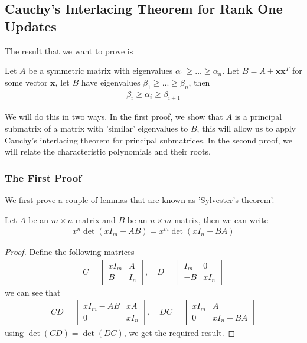 \documentclass{math}
\renewcommand{\vec}[1]{\boldsymbol{#1}}
\begin{document}
\subsection{Cauchy's Interlacing Theorem for Rank One Updates}

The result that we want to prove is

\begin{theorem}
    Let $A$ be a symmetric matrix with eigenvalues $\alpha_1 \geq ... \geq \alpha_n$.
    Let $B = A + \vec{x} \vec{x}^T$ for some vector $\vec{x}$, let $B$ have eigenvalues $\beta_1 \geq ... \geq \beta_n$, then
    \begin{align*}
        \beta_i \geq \alpha_i \geq \beta_{i + 1}
    \end{align*}
\end{theorem}

We will do this in two ways. In the first proof, we show that $A$ is a principal submatrix of a matrix with 'similar' eigenvalues to $B$,
this will allow us to apply Cauchy's interlacing theorem for principal submatrices.
In the second proof, we will relate the characteristic polynomials and their roots.

\subsubsection{The First Proof}

We first prove a couple of lemmas that are known as 'Sylvester's theorem'.

\begin{lemma}\label{lemma:sylvester}
    Let $A$ be an $m \times n$ matrix and $B$ be an $n \times m$ matrix, then we can write
    \begin{align*}
        x^n\det(xI_m - AB) = x^m\det(xI_n - BA)
    \end{align*}
\end{lemma}
\begin{proof}
    Define the following matrices
    \begin{align*}
        C = \begin{bmatrix}
            xI_m & A \\
            B & I_n
        \end{bmatrix},\quad
        D = \begin{bmatrix}
            I_m & 0 \\
            -B & xI_n
        \end{bmatrix}
    \end{align*}
    we can see that
    \begin{align*}
        CD = \begin{bmatrix}
            xI_m - AB & xA \\
            0 & xI_n
        \end{bmatrix},\quad
        DC = \begin{bmatrix}
            xI_m & A \\
            0 & xI_n - BA
        \end{bmatrix}
    \end{align*}
    using $\det(CD) = \det(DC)$, we get the required result.
\end{proof}
\end{document}
